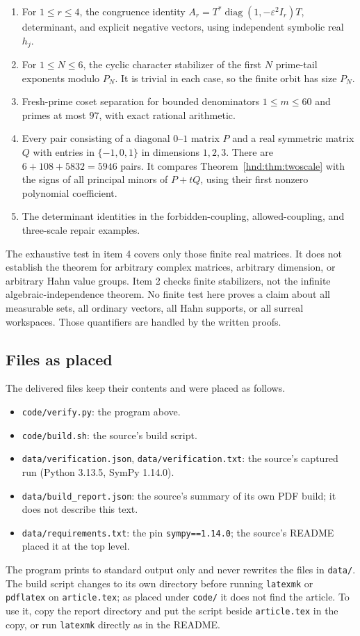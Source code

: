 \documentclass[11pt,oneside]{article}
\theoremstyle{definition}
\theoremstyle{remark}
\newcommand{\diag}{\operatorname{diag}}
\newcommand{\eps}{\varepsilon}
\begin{document}
\begin{enumerate}
\item For $1\le r\le4$, the congruence identity
$A_r=T^*\diag(1,-\eps^2I_r)T$, determinant, and explicit negative
vectors, using independent symbolic real $h_j$.
\item For $1\le N\le6$, the cyclic character stabilizer of the first
$N$ prime-tail exponents modulo $P_N$. It is trivial in each case,
so the finite orbit has size $P_N$.
\item Fresh-prime coset separation for bounded denominators
$1\le m\le60$ and primes at most $97$, with exact rational arithmetic.
\item Every pair consisting of a diagonal $0$--$1$ matrix $P$ and a real
symmetric matrix $Q$ with entries in $\{-1,0,1\}$ in dimensions
$1,2,3$. There are $6+108+5832=5946$ pairs. It compares
Theorem~\ref{hnd:thm:twoscale} with the signs of all principal minors of
$P+tQ$, using their first nonzero polynomial coefficient.
\item The determinant identities in the forbidden-coupling,
allowed-coupling, and three-scale repair examples.
\end{enumerate}

The exhaustive test in item 4 covers only those finite real matrices.
It does not establish the theorem for arbitrary complex matrices,
arbitrary dimension, or arbitrary Hahn value groups. Item 2 checks
finite stabilizers, not the infinite algebraic-independence theorem.
No finite test here proves a claim about all measurable sets, all
ordinary vectors, all Hahn supports, or all surreal workspaces.
Those quantifiers are handled by the written proofs.

\subsection{Files as placed}\label{hnd:app:files}

The delivered files keep their contents and were placed as follows.
\begin{itemize}
\item \texttt{code/verify.py}: the program above.
\item \texttt{code/build.sh}: the source's build script.
\item \texttt{data/verification.json}, \texttt{data/verification.txt}: the
source's captured run (Python 3.13.5, SymPy 1.14.0).
\item \texttt{data/build\_report.json}: the source's summary of its own PDF
build; it does not describe this text.
\item \texttt{data/requirements.txt}: the pin \texttt{sympy==1.14.0}; the
source's README placed it at the top level.
\end{itemize}
The program prints to standard output only and never rewrites the files in
\texttt{data/}. The build script changes to its own directory before
running \texttt{latexmk} or \texttt{pdflatex} on \texttt{article.tex}; as
placed under \texttt{code/} it does not find the article. To use it, copy
the report directory and put the script beside \texttt{article.tex} in the
copy, or run \texttt{latexmk} directly as in the README.
\end{document}
